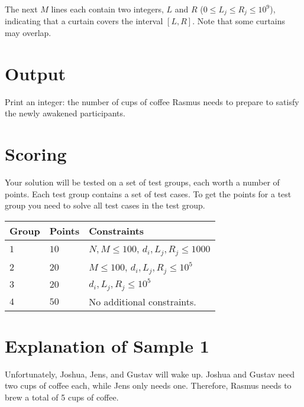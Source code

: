 The next $M$ lines each contain two integers, $L$ and $R$ ($0 \le L_j \le R_j \le 10^9$), indicating that a curtain covers the interval $[L, R]$.
Note that some curtains may overlap.

\section*{Output}
Print an integer: the number of cups of coffee Rasmus needs to prepare to satisfy the newly awakened participants.

\section*{Scoring}
Your solution will be tested on a set of test groups, each worth a number of points. Each test group contains
a set of test cases. To get the points for a test group you need to solve all test cases in the test group.

\noindent
\begin{tabular}{| l | l | p{12cm} |}
  \hline
  \textbf{Group} & \textbf{Points} & \textbf{Constraints} \\ \hline
  $1$    & $10$       & $N, M \le 100$, $d_i, L_j, R_j \le 1000$ \\ \hline
  $2$    & $20$       & $M \le 100$, $d_i, L_j, R_j \le 10^5$ \\ \hline
  $3$    & $20$       & $d_i, L_j, R_j \le 10^5$ \\ \hline
  $4$    & $50$       & No additional constraints. \\ \hline
\end{tabular}

\section*{Explanation of Sample 1}
Unfortunately, Joshua, Jens, and Gustav will wake up. Joshua and Gustav need two cups of coffee each, while Jens only needs one.
Therefore, Rasmus needs to brew a total of 5 cups of coffee.
